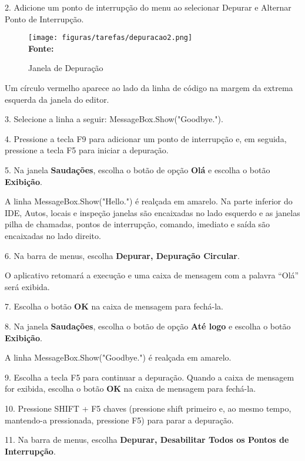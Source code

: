 2. Adicione um ponto de interrupção do menu ao selecionar Depurar e Alternar Ponto de Interrupção. 

\begin{figure}[ht!]
	\centering	
	\caption[\hspace{-0.1cm} Janela de Depuração]{Janela de Depuração}
	\vspace{-0.4cm}
	\texttt{[image: figuras/tarefas/depuracao2.png]}
	\vspace{-0.2cm}
	\\\textbf{\footnotesize Fonte:~\cite {tutorial_visual:14} }
	\label{fig:depuracao2}
	\vspace{-0.5cm}
\end{figure}

Um círculo vermelho aparece ao lado da linha de código na margem da extrema esquerda da janela do editor.

3. Selecione a linha a seguir: MessageBox.Show("Goodbye.").

4. Pressione a tecla F9 para adicionar um ponto de interrupção e, em seguida, pressione a tecla F5 para iniciar a depuração.

5. Na janela \textbf{Saudações}, escolha o botão de opção \textbf{Olá} e escolha o botão \textbf{Exibição}.

A linha MessageBox.Show("Hello.") é realçada em amarelo. Na parte inferior do IDE, Autos, locais e inspeção janelas são encaixadas no lado esquerdo e as janelas pilha de chamadas, pontos de interrupção, comando, imediato e saída são encaixadas no lado direito.

6. Na barra de menus, escolha \textbf{Depurar, Depuração Circular}.

O aplicativo retomará a execução e uma caixa de mensagem com a palavra ``Olá'' será exibida.

7. Escolha o botão \textbf{OK} na caixa de mensagem para fechá-la.

8. Na janela \textbf{Saudações}, escolha o botão de opção \textbf{Até logo} e escolha o botão \textbf{Exibição}.

A linha MessageBox.Show("Goodbye.") é realçada em amarelo.

9. Escolha a tecla F5 para continuar a depuração. Quando a caixa de mensagem for exibida, escolha o botão \textbf{OK} na caixa de mensagem para fechá-la.

10. Pressione SHIFT + F5 chaves (pressione shift primeiro e, ao mesmo tempo, mantendo-a pressionada, pressione F5) para parar a depuração.

11. Na barra de menus, escolha \textbf{Depurar, Desabilitar Todos os Pontos de Interrupção}.
